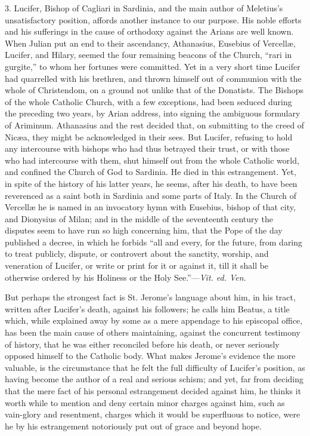 3. Lucifer, Bishop of Cagliari in Sardinia, and
the main author of Meletius's unsatisfactory position, affords
another instance to our purpose. His noble efforts and his sufferings
in the cause of orthodoxy against the Arians are well known. When
Julian put an end to their ascendancy, Athanasius, Eusebius of Vercellæ,
Lucifer, and Hilary, seemed the four remaining beacons of the Church, ``rari in
gurgite,'' to whom her fortunes were committed. Yet in a
very short time Lucifer had quarrelled with his brethren, and thrown
himself out of communion with the whole of Christendom, on a ground
not unlike that of the Donatists. The Bishops of the whole Catholic
Church, with a few exceptions, had been seduced during the preceding
two years, by Arian address, into signing the ambiguous formulary of
Ariminum. Athanasius and the rest decided that, on submitting to the
creed of Nicæa, they might be acknowledged in their sees. But
Lucifer, refusing to hold any intercourse with bishops who had thus
betrayed their trust, or with those who had intercourse with them,
shut himself out from the whole Catholic world, and confined the
Church of God to Sardinia. He died in this estrangement. Yet, in spite
of the history of his latter years, he seems, after his death, to have
been reverenced as a saint both in Sardinia and some parts of Italy.
In the Church of Vercellæ he is named in an invocatory hymn with
Eusebius, bishop of that city, and Dionysius of Milan; and in the
middle of the seventeenth century the disputes seem to have run so
high concerning him, that the Pope of the day published a decree, in
which he forbids ``all and every, for the future, from daring to
treat publicly, dispute, or controvert about the sanctity, worship,
and veneration of Lucifer, or write or print for it or against it,
till it shall be otherwise ordered by his Holiness or the Holy
See.''—\emph{Vit. ed. Ven}.

But perhaps the strongest fact is St. Jerome's
language about him, in his tract, written after Lucifer's death,
against his followers; he calls him Beatus, a title which, while
explained away by some as a mere appendage to his episcopal office,
has been the main cause of others maintaining, against the concurrent
testimony of history, that he was either reconciled before his death,
or never seriously opposed himself to the Catholic body. What makes
Jerome's evidence the more valuable, is the circumstance that he
felt the full difficulty of Lucifer's position, as having become the
author of a real and serious schism; and yet, far from deciding that
the mere fact of his personal estrangement decided against him, he
thinks it worth while to mention and deny certain minor charges
against him, such as vain-glory and resentment, charges which it would
be superfluous to notice, were he by his estrangement notoriously put
out of grace and beyond hope.

